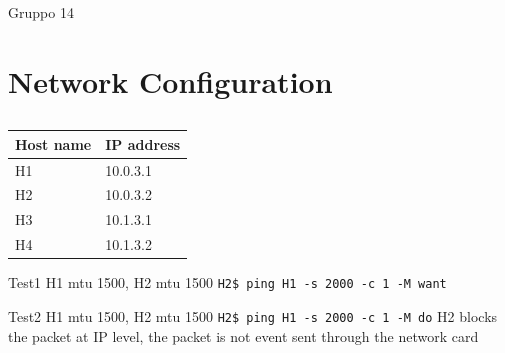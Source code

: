 \documentclass{exam}
\begin{document}
\newcommand{\LoggaEng}{
	\textsc{\Huge Uppsala University}\\[0.7cm]
	\texttt{[image: Uppsala\_University\_seal\_svg.png]}\\[0.5cm]
}


\begin{titlepage}

	\center


	\LoggaSwe



	\Large Gruppo 14\\



	\vfill

\end{titlepage}
\pagebreak


\section{Network Configuration}
\begin{table}
  \caption{}\label{tab:}
  \begin{center}
    \begin{tabular}{|l|l|}
      \hline
      Host name & IP address \\
      \hline
      H1 & 10.0.3.1 \\
      \hline
      H2 & 10.0.3.2 \\
      \hline
      H3 & 10.1.3.1 \\
      \hline
      H4 & 10.1.3.2 \\
      \hline
    \end{tabular}
  \end{center}
\end{table}

Test1
H1 mtu 1500, H2 mtu 1500
\verb|H2$ ping H1 -s 2000 -c 1 -M want|

Test2
H1 mtu 1500, H2 mtu 1500
\verb|H2$ ping H1 -s 2000 -c 1 -M do|
H2 blocks the packet at IP level, the packet is not event sent through the network card
\end{document}
